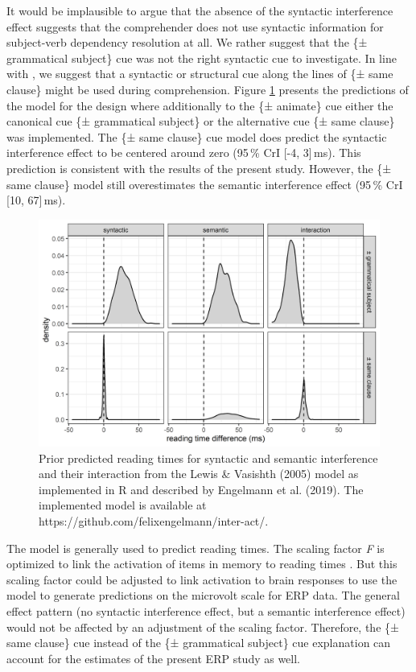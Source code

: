 \documentclass[a4paper, man, floatsintext]{apa7}
\begin{document}
It would be implausible to argue that the absence of the syntactic interference effect suggests that the comprehender does not use syntactic information for subject-verb dependency resolution at all. We rather suggest that the \{± grammatical subject\} cue was not the right syntactic cue to investigate. In line with \citet{mertzen}, we suggest that a syntactic or structural cue along the lines of \{± same clause\} might be used during comprehension. Figure \ref{fig:model_predictions} presents the predictions of the \citet{Lewis2005} model for the \citet{vandyke07} design where additionally to the \{± animate\} cue either the canonical cue \{± grammatical subject\} or the alternative cue \{± same clause\} was implemented. The \{± same clause\} cue model does predict the syntactic interference effect to be centered around zero (95\,\% CrI [-4, 3]\,ms). This prediction is consistent with the results of the present study. However, the \{± same clause\} model still overestimates the semantic interference effect (95\,\% CrI [10, 67]\,ms).

\begin{figure}[H]
    \centering
    \caption{Prior predicted reading times for syntactic and semantic interference and their interaction from the Lewis \& Vasishth (2005) model as implemented in R and described by Engelmann et al. (2019). The implemented model is available at https://github.com/felixengelmann/inter-act/.}
    \label{fig:model_predictions}\includegraphics[width=\textwidth]{images/PriorPredicted_LV05_engelmann_effects_syncue.png}
\end{figure}

The \citet{Lewis2005} model is generally used to predict reading times. The scaling factor \textit{F} is optimized to link the activation of items in memory to reading times \citep{Lewis2005}. But this scaling factor could be adjusted to link activation to brain responses to use the model to generate predictions on the microvolt scale for ERP data. The general effect pattern (no syntactic interference effect, but a semantic interference effect) would not be affected by an adjustment of the scaling factor. Therefore, the \{± same clause\} cue instead of the \{± grammatical subject\} cue explanation can account for the estimates of the present ERP study as well.
\end{document}

